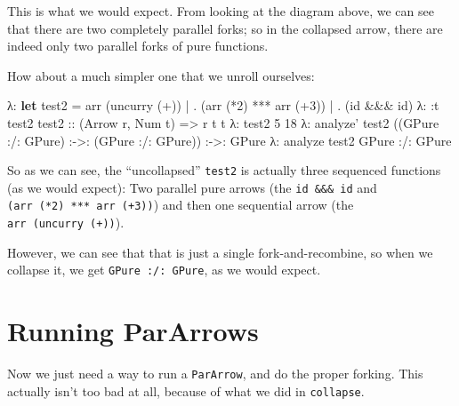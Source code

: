 \documentclass[]{article}
\newenvironment{Shaded}{}{}
\newcommand{\KeywordTok}[1]{\textcolor[rgb]{0.00,0.44,0.13}{\textbf{{#1}}}}
\newcommand{\DataTypeTok}[1]{\textcolor[rgb]{0.56,0.13,0.00}{{#1}}}
\newcommand{\DecValTok}[1]{\textcolor[rgb]{0.25,0.63,0.44}{{#1}}}
\newcommand{\OtherTok}[1]{\textcolor[rgb]{0.00,0.44,0.13}{{#1}}}
\newcommand{\FunctionTok}[1]{\textcolor[rgb]{0.02,0.16,0.49}{{#1}}}
\newcommand{\NormalTok}[1]{{#1}}
\begin{document}
This is what we would expect. From looking at the diagram above, we can
see that there are two completely parallel forks; so in the collapsed
arrow, there are indeed only two parallel forks of pure functions.

How about a much simpler one that we unroll ourselves:

\begin{Shaded}
\begin{Highlighting}[]
\NormalTok{λ}\FunctionTok{:} \KeywordTok{let} \NormalTok{test2 }\FunctionTok{=} \NormalTok{arr (uncurry (}\FunctionTok{+}\NormalTok{))}
 \FunctionTok{|}           \FunctionTok{.} \NormalTok{(arr (}\FunctionTok{*}\DecValTok{2}\NormalTok{) }\FunctionTok{***} \NormalTok{arr (}\FunctionTok{+}\DecValTok{3}\NormalTok{))}
 \FunctionTok{|}           \FunctionTok{.} \NormalTok{(id }\FunctionTok{&&&} \NormalTok{id)}
\NormalTok{λ}\FunctionTok{:} \FunctionTok{:}\NormalTok{t test2}
\OtherTok{test2 ::} \NormalTok{(}\DataTypeTok{Arrow} \NormalTok{r, }\DataTypeTok{Num} \NormalTok{t) }\OtherTok{=>} \NormalTok{r t t}
\NormalTok{λ}\FunctionTok{:} \NormalTok{test2 }\DecValTok{5}
\DecValTok{18}
\NormalTok{λ}\FunctionTok{:} \NormalTok{analyze' test2}
\NormalTok{((}\DataTypeTok{GPure} \FunctionTok{:/:} \DataTypeTok{GPure}\NormalTok{) }\FunctionTok{:->:} \NormalTok{(}\DataTypeTok{GPure} \FunctionTok{:/:} \DataTypeTok{GPure}\NormalTok{)) }\FunctionTok{:->:} \DataTypeTok{GPure}
\NormalTok{λ}\FunctionTok{:} \NormalTok{analyze test2}
\DataTypeTok{GPure} \FunctionTok{:/:} \DataTypeTok{GPure}
\end{Highlighting}
\end{Shaded}

So as we can see, the ``uncollapsed'' \texttt{test2} is actually three
sequenced functions (as we would expect): Two parallel pure arrows (the
\texttt{id\ \&\&\&\ id} and \texttt{(arr\ (*2)\ ***\ arr\ (+3))}) and
then one sequential arrow (the \texttt{arr\ (uncurry\ (+))}).

However, we can see that that is just a single fork-and-recombine, so
when we collapse it, we get \texttt{GPure\ :/:\ GPure}, as we would
expect.

\section{Running ParArrows}\label{running-pararrows}

Now we just need a way to run a \texttt{ParArrow}, and do the proper
forking. This actually isn't too bad at all, because of what we did in
\texttt{collapse}.
\end{document}
